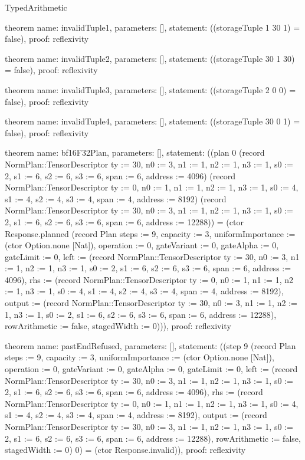 \begin{lexlean}{TypedArithmetic}
\begin{semanticmodule}
theorem{
  name: invalidTuple1,
  parameters: [],
  statement: ((storageTuple 1 30 1) = false),
  proof: reflexivity{}
}

theorem{
  name: invalidTuple2,
  parameters: [],
  statement: ((storageTuple 30 1 30) = false),
  proof: reflexivity{}
}

theorem{
  name: invalidTuple3,
  parameters: [],
  statement: ((storageTuple 2 0 0) = false),
  proof: reflexivity{}
}

theorem{
  name: invalidTuple4,
  parameters: [],
  statement: ((storageTuple 30 0 1) = false),
  proof: reflexivity{}
}

theorem{
  name: bf16F32Plan,
  parameters: [],
  statement: ((plan 0 (record NormPlan::TensorDescriptor {ty := 30, n0 := 3, n1 := 1, n2 := 1, n3 := 1, s0 := 2, s1 := 6, s2 := 6, s3 := 6, span := 6, address := 4096}) (record NormPlan::TensorDescriptor {ty := 0, n0 := 1, n1 := 1, n2 := 1, n3 := 1, s0 := 4, s1 := 4, s2 := 4, s3 := 4, span := 4, address := 8192}) (record NormPlan::TensorDescriptor {ty := 30, n0 := 3, n1 := 1, n2 := 1, n3 := 1, s0 := 2, s1 := 6, s2 := 6, s3 := 6, span := 6, address := 12288})) = (ctor Response.planned (record Plan {steps := 9, capacity := 3, uniformImportance := (ctor Option.none [Nat]), operation := 0, gateVariant := 0, gateAlpha := 0, gateLimit := 0, left := (record NormPlan::TensorDescriptor {ty := 30, n0 := 3, n1 := 1, n2 := 1, n3 := 1, s0 := 2, s1 := 6, s2 := 6, s3 := 6, span := 6, address := 4096}), rhs := (record NormPlan::TensorDescriptor {ty := 0, n0 := 1, n1 := 1, n2 := 1, n3 := 1, s0 := 4, s1 := 4, s2 := 4, s3 := 4, span := 4, address := 8192}), output := (record NormPlan::TensorDescriptor {ty := 30, n0 := 3, n1 := 1, n2 := 1, n3 := 1, s0 := 2, s1 := 6, s2 := 6, s3 := 6, span := 6, address := 12288}), rowArithmetic := false, stagedWidth := 0}))),
  proof: reflexivity{}
}

theorem{
  name: pastEndRefused,
  parameters: [],
  statement: ((step 9 (record Plan {steps := 9, capacity := 3, uniformImportance := (ctor Option.none [Nat]), operation := 0, gateVariant := 0, gateAlpha := 0, gateLimit := 0, left := (record NormPlan::TensorDescriptor {ty := 30, n0 := 3, n1 := 1, n2 := 1, n3 := 1, s0 := 2, s1 := 6, s2 := 6, s3 := 6, span := 6, address := 4096}), rhs := (record NormPlan::TensorDescriptor {ty := 0, n0 := 1, n1 := 1, n2 := 1, n3 := 1, s0 := 4, s1 := 4, s2 := 4, s3 := 4, span := 4, address := 8192}), output := (record NormPlan::TensorDescriptor {ty := 30, n0 := 3, n1 := 1, n2 := 1, n3 := 1, s0 := 2, s1 := 6, s2 := 6, s3 := 6, span := 6, address := 12288}), rowArithmetic := false, stagedWidth := 0}) 0) = (ctor Response.invalid)),
  proof: reflexivity{}
}


\end{semanticmodule}
\end{lexlean}
